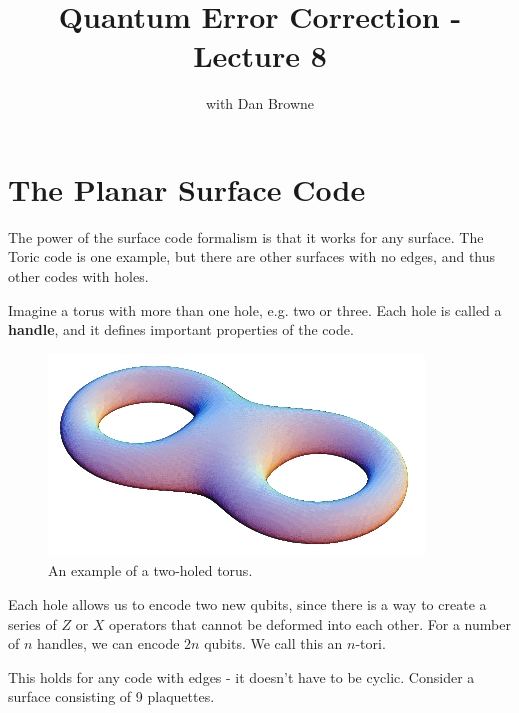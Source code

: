


\title{Quantum Error Correction - Lecture 8}
\author{with Dan Browne}
\maketitle
\tableofcontents

\section{The Planar Surface Code}
The power of the surface code formalism is that it works for any surface. The Toric code is one example, but there are other surfaces with no edges, and thus other codes with holes. 

Imagine a torus with more than one hole, e.g. two or three. Each hole is called a \textbf{handle}, and it defines important properties of the code. 

\begin{figure}[h]
\centering
\includegraphics[width= \textwidth]{./2Torus.jpg}
\caption{An example of a two-holed torus.}
\end{figure}

Each hole allows us to encode two new qubits, since there is a way to create a series of  $Z$ or $X$ operators that cannot be deformed into each other. For a number of $n$ handles, we can encode $2n$ qubits. We call this an $n$-tori. 

This holds for any code with edges - it doesn't have to be cyclic. Consider a surface consisting of 9 plaquettes. 

